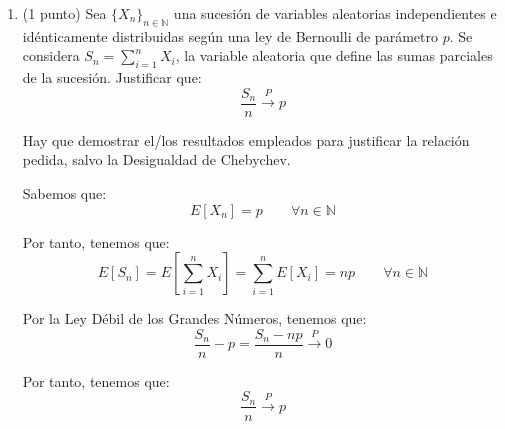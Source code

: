 \documentclass[12pt]{article}
\begin{document}
\begin{ejercicio}[1.5 puntos]
\begin{enumerate}
            \item (1 punto) Sea $\{X_n\}_{n \in \mathbb{N}}$ una sucesión de variables aleatorias independientes e idénticamente distribuidas según una ley de Bernoulli de parámetro $p$. Se considera $S_n = \sum\limits_{i=1}^n X_i$, la variable aleatoria que define las sumas parciales de la sucesión. Justificar que: $$\frac{S_n}{n} \xrightarrow{P} p$$
            \begin{observacion}
                Hay que demostrar el/los resultados empleados para justificar la relación pedida, salvo la Desigualdad de Chebychev.
            \end{observacion}
            Sabemos que:
            \begin{equation*}
                E[X_n] = p\qquad \forall n \in \mathbb{N}
            \end{equation*}

            Por tanto, tenemos que:
            \begin{equation*}
                E[S_n] = E\left[\sum_{i=1}^n X_i\right] = \sum_{i=1}^n E[X_i] = np\qquad \forall n \in \mathbb{N}
            \end{equation*}
            
            Por la Ley Débil de los Grandes Números, tenemos que:
            \begin{equation*}
                \frac{S_n}{n}-p = \frac{S_n-np}{n} \xrightarrow{P} 0
            \end{equation*}

            Por tanto, tenemos que:
            \begin{equation*}
                \frac{S_n}{n} \xrightarrow{P} p
            \end{equation*}
        \end{enumerate}
    \end{ejercicio}
\end{document}
